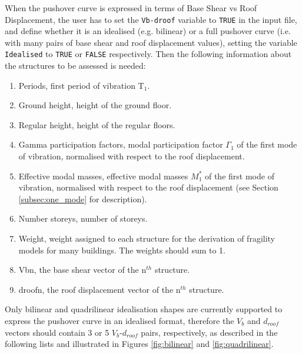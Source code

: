 When the pushover curve is expressed in terms of Base Shear vs Roof Displacement, the user has to set the \verb=Vb-droof= variable to \verb=TRUE= in the input file, and define whether it is an idealised (e.g. bilinear) or a full pushover curve (i.e. with many pairs of base shear and roof displacement values), setting the variable \verb=Idealised= to \verb=TRUE= or \verb=FALSE= respectively. Then the following information about the structures to be assessed is needed:\\

\begin{enumerate}
\item Periods, first period of vibration T$_1$.
\item Ground height, height of the ground floor.
\item Regular height, height of the regular floors.
\item Gamma participation factors, modal participation factor $\Gamma_1$ of the first mode of vibration, normalised with respect to the roof displacement.
\item Effective modal masses, effective modal masses $M_{1}^{*}$ of the first mode of vibration, normalised with respect to the roof displacement (see Section \ref{subsec:one_mode} for description).
\item Number storeys, number of storeys.
\item Weight, weight assigned to each structure for the derivation of fragility models for many buildings. The weights should sum to 1.
\item Vbn, the base shear vector of the n$^{th}$ structure.
\item droofn, the roof displacement vector of the n$^{th}$ structure. \\
\end{enumerate}

Only bilinear and quadrilinear idealisation shapes are currently supported to express the pushover curve in an idealised format, therefore the $V_b$ and $d_{roof}$ vectors should contain 3 or 5 $V_b$-$d_{roof}$ pairs, respectively, as described in the following lists and illustrated in Figures \ref{fig:bilinear} and \ref{fig:quadrilinear}.\\

